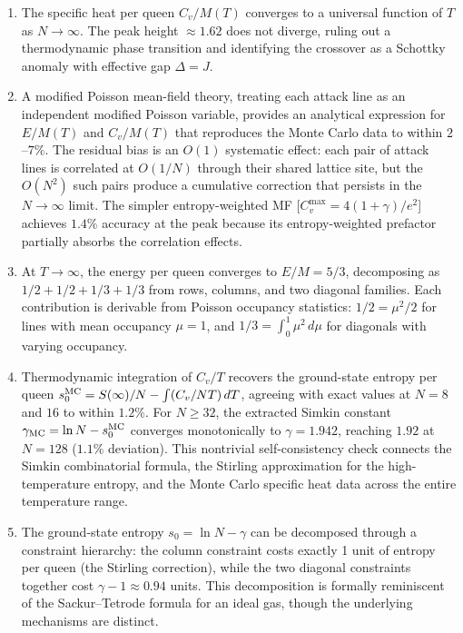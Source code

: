 \documentclass[aps, pre, reprint, amsmath, amssymb, superscriptaddress, floatfix]{revtex4-2}
\begin{document}
\begin{enumerate}
\item The specific heat per queen $C_v/M(T)$ converges to a universal
  function of $T$ as $N \to \infty$.  The peak height $\approx 1.62$
  does not diverge, ruling out a thermodynamic phase transition and
  identifying the crossover as a Schottky anomaly with effective gap
  $\Delta = J$.

\item A modified Poisson mean-field theory, treating each attack line
  as an independent modified Poisson variable, provides an analytical
  expression for $E/M(T)$ and $C_v/M(T)$ that reproduces the Monte
  Carlo data to within $2$--$7\%$.  The residual bias is an $O(1)$
  systematic effect: each pair of attack lines is correlated at
  $O(1/N)$ through their shared lattice site, but the $O(N^2)$ such
  pairs produce a cumulative correction that persists in the
  $N \to \infty$ limit.  The simpler entropy-weighted MF
  [$C_v^{\max} = 4(1+\gamma)/e^2$] achieves $1.4\%$ accuracy at the
  peak because its entropy-weighted prefactor partially absorbs
  the correlation effects.

\item At $T \to \infty$, the energy per queen converges to
  $E/M = 5/3$, decomposing as $1/2 + 1/2 + 1/3 + 1/3$ from
  rows, columns, and two diagonal families.  Each contribution is
  derivable from Poisson occupancy statistics: $1/2 = \mu^2/2$ for
  lines with mean occupancy $\mu = 1$, and
  $1/3 = \int_0^1 \mu^2\,d\mu$ for diagonals with varying
  occupancy.

\item Thermodynamic integration of $C_v/T$ recovers the ground-state
  entropy per queen $s_0^{\rm MC} = S(\infty)/N - \int(C_v/NT)\,dT$,
  agreeing with exact values at $N = 8$ and $16$ to within $1.2\%$.
  For $N \ge 32$, the extracted Simkin constant
  $\gamma_{\rm MC} = \ln N - s_0^{\rm MC}$ converges monotonically
  to $\gamma = 1.942$, reaching $1.92$ at $N = 128$ ($1.1\%$
  deviation).  This nontrivial self-consistency check connects
  the Simkin combinatorial formula, the Stirling approximation for
  the high-temperature entropy, and the Monte Carlo specific heat
  data across the entire temperature range.

\item The ground-state entropy $s_0 = \ln N - \gamma$ can be
  decomposed through a constraint hierarchy: the column constraint
  costs exactly 1 unit of entropy per queen (the Stirling correction),
  while the two diagonal constraints together cost
  $\gamma - 1 \approx 0.94$ units.  This decomposition is formally
  reminiscent of the Sackur--Tetrode formula for an ideal gas,
  though the underlying mechanisms are distinct.


\end{enumerate}
\end{document}
